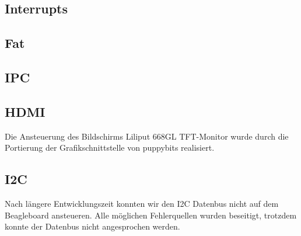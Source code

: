 \documentclass[10pt,a4paper,fleqn]{article}
\begin{document}
\subsection{Interrupts}

	

\subsection{Fat}

\subsection{IPC}

\subsection{HDMI}
	Die Ansteuerung des Bildschirms Liliput 668GL TFT-Monitor wurde durch die Portierung der 	Grafikschnittstelle von puppybits realisiert.

\subsection{I2C}
	Nach längere Entwicklungszeit konnten wir den I2C Datenbus nicht auf dem Beagleboard ansteueren.
		Alle möglichen Fehlerquellen wurden beseitigt, trotzdem konnte der Datenbus nicht angesprochen
		werden.
		
\end{document}
